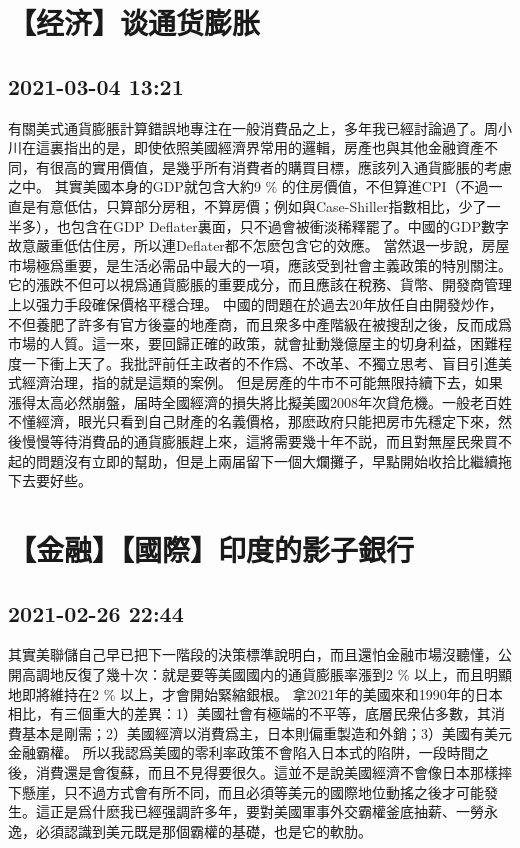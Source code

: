 \documentclass[twocolumn]{ctexart}
\begin{document}
\section*{【经济】谈通货膨胀}
\subsection*{2021-03-04 13:21}

有關美式通貨膨脹計算錯誤地專注在一般消費品之上，多年我已經討論過了。周小川在這裏指出的是，即使依照美國經濟界常用的邏輯，房產也與其他金融資產不同，有很高的實用價值，是幾乎所有消費者的購買目標，應該列入通貨膨脹的考慮之中。
其實美國本身的GDP就包含大約9 \% 的住房價值，不但算進CPI（不過一直是有意低估，只算部分房租，不算房價；例如與Case-Shiller指數相比，少了一半多），也包含在GDP Deflater裏面，只不過會被衝淡稀釋罷了。中國的GDP數字故意嚴重低估住房，所以連Deflater都不怎麽包含它的效應。
當然退一步說，房屋市場極爲重要，是生活必需品中最大的一項，應該受到社會主義政策的特別關注。它的漲跌不但可以視爲通貨膨脹的重要成分，而且應該在稅務、貨幣、開發商管理上以强力手段確保價格平穩合理。
中國的問題在於過去20年放任自由開發炒作，不但養肥了許多有官方後臺的地產商，而且衆多中產階級在被搜刮之後，反而成爲市場的人質。這一來，要回歸正確的政策，就會扯動幾億屋主的切身利益，困難程度一下衝上天了。我批評前任主政者的不作爲、不改革、不獨立思考、盲目引進美式經濟治理，指的就是這類的案例。
但是房產的牛市不可能無限持續下去，如果漲得太高必然崩盤，届時全國經濟的損失將比擬美國2008年次貸危機。一般老百姓不懂經濟，眼光只看到自己財產的名義價格，那麽政府只能把房市先穩定下來，然後慢慢等待消費品的通貨膨脹趕上來，這將需要幾十年不説，而且對無屋民衆買不起的問題沒有立即的幫助，但是上兩届留下一個大爛攤子，早點開始收拾比繼續拖下去要好些。
\section*{【金融】【國際】印度的影子銀行}
\subsection*{2021-02-26 22:44}

其實美聯儲自己早已把下一階段的決策標準說明白，而且還怕金融市場沒聽懂，公開高調地反復了幾十次：就是要等美國國内的通貨膨脹率漲到2 \% 以上，而且明顯地即將維持在2 \% 以上，才會開始緊縮銀根。
拿2021年的美國來和1990年的日本相比，有三個重大的差異：1）美國社會有極端的不平等，底層民衆佔多數，其消費基本是剛需；2）美國經濟以消費爲主，日本則偏重製造和外銷；3）美國有美元金融霸權。
所以我認爲美國的零利率政策不會陷入日本式的陷阱，一段時間之後，消費還是會復蘇，而且不見得要很久。這並不是說美國經濟不會像日本那樣摔下懸崖，只不過方式會有所不同，而且必須等美元的國際地位動搖之後才可能發生。這正是爲什麽我已經强調許多年，要對美國軍事外交霸權釜底抽薪、一勞永逸，必須認識到美元既是那個霸權的基礎，也是它的軟肋。
\end{document}
